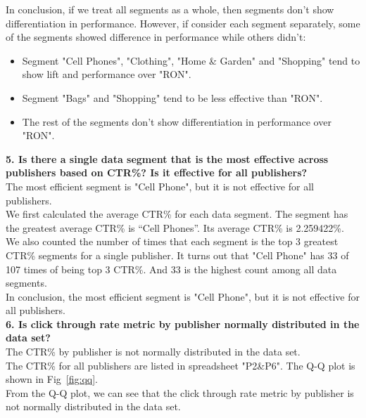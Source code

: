 \documentclass[12pt]{article}
\begin{document}
In conclusion, if we treat all segments as a whole, then segments don't show differentiation in performance. However, if consider each segment separately, some of the segments showed difference in performance while others didn't:

\begin{itemize}
  \item Segment "Cell Phones", "Clothing", "Home \& Garden" and "Shopping" tend to show lift and performance over "RON".
  \item Segment "Bags" and "Shopping" tend to be less effective than "RON". 
  \item The rest of the segments don't show differentiation in performance over "RON".
\end{itemize}

{\bf 5.	Is there a single data segment that is the most effective across publishers based on CTR\%? Is it effective for all publishers?} \\

The most efficient segment is "Cell Phone", but it is not effective for all publishers. \\

We first calculated the average CTR\% for each data segment. The segment has the greatest average CTR\% is ``Cell Phones''. Its average CTR\% is 2.259422\%. \\

We also counted the number of times that each segment is the top 3 greatest CTR\% segments for a single publisher. It turns out that "Cell Phone" has 33 of 107 times of being top 3 CTR\%. And 33 is the highest count among all data segments. \\

In conclusion, the most efficient segment is "Cell Phone", but it is not effective for all publishers. \\

{\bf 6. Is click through rate metric by publisher normally distributed in the data set?} \\

The CTR\% by publisher is not normally distributed in the data set. \\

The CTR\% for all publishers are listed in spreadsheet "P2\&P6". The Q-Q plot is shown in Fig~\ref{fig:qq}. \\

From the Q-Q plot, we can see that the click through rate metric by publisher is not normally distributed in the data set. \\
\end{document}
